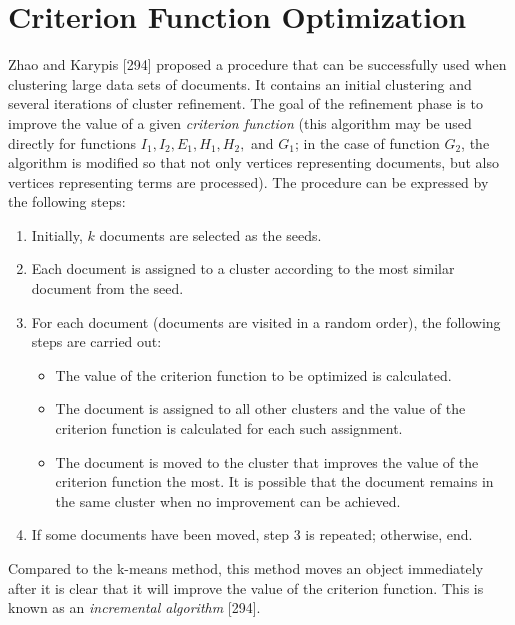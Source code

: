 \documentclass[11pt,openany,executivepaper]{book}
\begin{document}
\section{Criterion Function Optimization}

Zhao and Karypis [294] proposed a procedure that can be successfully used when clustering large data sets of documents. 
It contains an initial clustering and several iterations of cluster refinement. The goal of the refinement phase is to improve the value of a given \textit{criterion function} (this algorithm may be used directly for functions \(I_1, I_2, E_1, H_1, H_2,\) and \(G_1\); in the case of function \(G_2\), the algorithm is modified so that not only vertices representing documents, but also vertices representing terms are processed). The procedure can be expressed by the following steps:

\begin{enumerate}
    \item Initially, \( k \) documents are selected as the seeds.
    
    \item Each document is assigned to a cluster according to the most similar document from the seed.
    
    \item For each document (documents are visited in a random order), the following steps are carried out:
    \begin{itemize}
        \item The value of the criterion function to be optimized is calculated.
        \item The document is assigned to all other clusters and the value of the criterion function is calculated for each such assignment.
        \item The document is moved to the cluster that improves the value of the criterion function the most. It is possible that the document remains in the same cluster when no improvement can be achieved.
    \end{itemize}
    
    \item If some documents have been moved, step 3 is repeated; otherwise, end.
\end{enumerate}

Compared to the k-means method, this method moves an object immediately after it is clear that it will improve the value of the criterion function. 
This is known as an \textit{incremental algorithm} [294].
\end{document}
